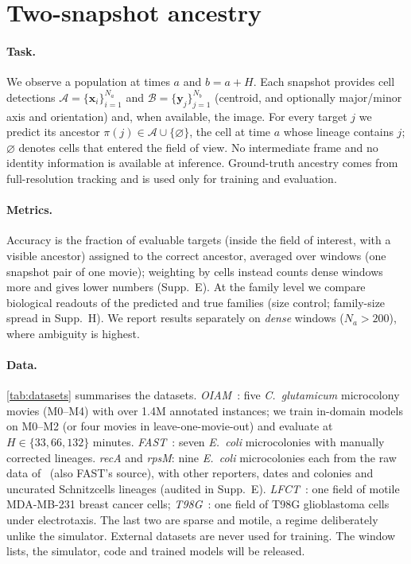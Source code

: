 \section{Two-snapshot ancestry}
\label{sec:problem}

\paragraph{Task.}
We observe a population at times $a$ and $b{=}a{+}H$.
Each snapshot provides cell detections $\mathcal{A}{=}\{\mathbf{x}_i\}_{i=1}^{N_a}$ and $\mathcal{B}{=}\{\mathbf{y}_j\}_{j=1}^{N_b}$ (centroid, and optionally major/minor axis and orientation) and, when available, the image.
For every target $j$ we predict its ancestor $\pi(j)\in\mathcal{A}\cup\{\varnothing\}$, the cell at time $a$ whose lineage contains $j$; $\varnothing$ denotes cells that entered the field of view.
No intermediate frame and no identity information is available at inference.
Ground-truth ancestry comes from full-resolution tracking and is used only for training and evaluation.

\paragraph{Metrics.}
Accuracy is the fraction of evaluable targets (inside the field of interest, with a visible ancestor) assigned to the correct ancestor, averaged over windows (one snapshot pair of one movie); weighting by cells instead counts dense windows more and gives lower numbers (Supp.~E).
At the family level we compare biological readouts of the predicted and true families (size control; family-size spread in Supp.~H).
We report results separately on \emph{dense} windows ($N_a{>}200$), where ambiguity is highest.

\paragraph{Data.}
\cref{tab:datasets} summarises the datasets.
\emph{OIAM}~\cite{seiffarth2024oiam}: five \emph{C.~glutamicum} microcolony movies (M0--M4) with over 1.4M annotated instances; we train in-domain models on M0--M2 (or four movies in leave-one-movie-out) and evaluate at $H\in\{33,66,132\}$ minutes.
\emph{FAST}~\cite{meacock2023fast}: seven \emph{E.~coli} microcolonies with manually corrected lineages.
\emph{recA} and \emph{rpsM}: nine \emph{E.~coli} microcolonies each from the raw data of~\cite{vanvliet2018spatially} (also FAST's source), with other reporters, dates and colonies and uncurated Schnitzcells lineages (audited in Supp.~E).
\emph{LFCT}~\cite{gachloo2026lfct}: one field of motile MDA-MB-231 breast cancer cells; \emph{T98G}~\cite{chang2026tui}: one field of T98G glioblastoma cells under electrotaxis.
The last two are sparse and motile, a regime deliberately unlike the simulator.
External datasets are never used for training.
The window lists, the \rodsim simulator, code and trained models will be released.

